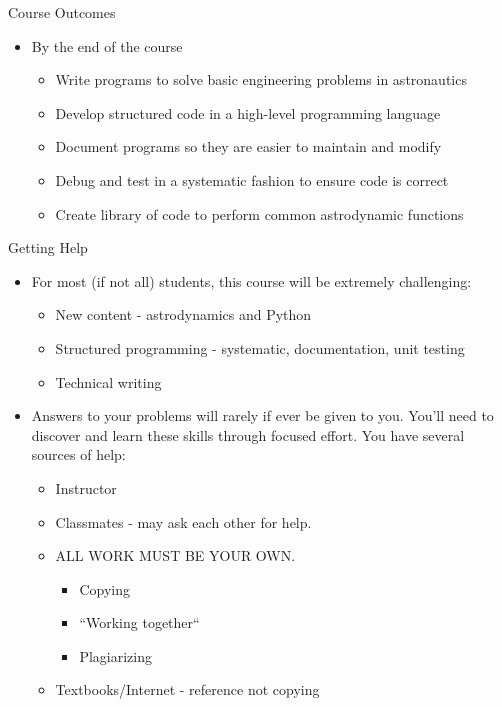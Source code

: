 \documentclass[11pt,professionalfonts]{beamer}
\begin{document}
\begin{frame}{Course Outcomes}
    \begin{itemize}
        \item By the end of the course
            \begin{itemize}
                \item Write programs to solve basic engineering problems in astronautics
                \item Develop structured code in a high-level programming language
                \item Document programs so they are easier to maintain and modify
                \item Debug and test in a systematic fashion to ensure code is correct
                \item Create library of code to perform common astrodynamic functions
            \end{itemize}
    \end{itemize}
\end{frame}

\begin{frame}{Getting Help}
    \begin{itemize}
        \item For most (if not all) students, this course will be extremely challenging:
            \begin{itemize}
                \item New content - astrodynamics and Python
                \item Structured programming - systematic, documentation, unit testing
                \item Technical writing 
            \end{itemize}
        \item Answers to your problems will rarely if ever be given to you. 
            You'll need to discover and learn these skills through focused effort.
            You have several sources of help:
            \begin{itemize}
                \item Instructor
                \item Classmates - may ask each other for help.
                \item ALL WORK MUST BE YOUR OWN.
                    \begin{itemize}
                        \item Copying
                        \item ``Working together``
                        \item Plagiarizing
                    \end{itemize}
                \item Textbooks/Internet - reference not copying
            \end{itemize}
    \end{itemize}
\end{frame}
\end{document}
